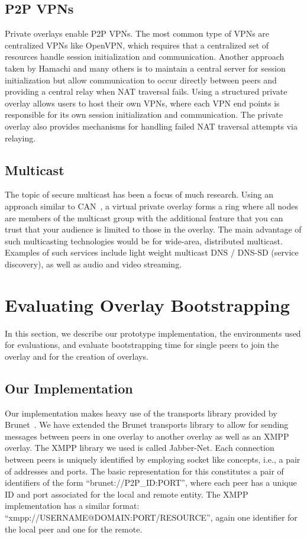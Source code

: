 \documentclass[conference]{IEEEtran}
\begin{document}
\subsection{P2P VPNs}
Private overlays enable P2P VPNs.  The most common type of VPNs are centralized
VPNs like OpenVPN, which requires that a centralized set of resources handle
session initialization and communication.  Another approach taken by Hamachi
and many others is to maintain a central server for session initialization but
allow communication to occur directly between peers and providing a central
relay when NAT traversal fails.  Using a structured private overlay allows
users to host their own VPNs, where each VPN end points is responsible for its
own session initialization and communication.  The private overlay also
provides mechanisms for handling failed NAT traversal attempts via relaying.

\subsection{Multicast}
The topic of secure multicast has been a focus of much research.  Using an
approach similar to CAN~\cite{can_multicast}, a virtual private overlay forms a
ring where all nodes are members of the multicast group with the additional
feature that you can trust that your audience is limited to those in the
overlay.  The main advantage of such multicasting technologies would be for
wide-area, distributed multicast.  Examples of such services include light
weight multicast DNS / DNS-SD (service discovery), as well as audio and video
streaming.

\section{Evaluating Overlay Bootstrapping}
\label{evaluations}
In this section, we describe our prototype implementation, the environments
used for evaluations, and evaluate bootstrapping time for single peers to
join the overlay and for the creation of overlays.

\subsection{Our Implementation}

Our implementation makes heavy use of the transports library provided by
Brunet~\cite{brunet}.  We have extended the Brunet transports library to allow
for sending messages between peers in one overlay to another overlay as well as
an XMPP overlay.  The XMPP library we used is called Jabber-Net.  Each
connection between peers is uniquely identified by employing socket like
concepts, i.e., a pair of addresses and ports.  The basic representation for
this constitutes a pair of identifiers of the form ``brunet://P2P\_ID:PORT'',
where each peer has a unique ID and port associated for the local and remote
entity.  The XMPP implementation has a similar format:
``xmpp://USERNAME@DOMAIN:PORT/RESOURCE'', again one identifier for the local
peer and one for the remote.
\end{document}
